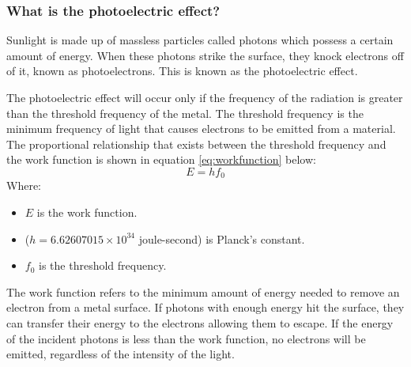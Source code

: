 \subsubsection{What is the photoelectric effect?}
Sunlight is made up of massless particles called photons which possess a certain amount of energy. When these photons strike the surface, they knock electrons off of it, known as photoelectrons. This is known as the photoelectric effect.\vspace{0.5em}

\noindent The photoelectric effect will occur only if the frequency of the radiation is greater than the threshold frequency of the metal. The threshold frequency is the minimum frequency of light that causes electrons to be emitted from a material. The proportional relationship that exists between the threshold frequency and the work function is shown in equation \ref{eq:workfunction} below:
\begin{equation}
    E = hf_0
    \label{eq:workfunction}
\end{equation}
Where:
\begin{itemize}
    \item $E$ is the work function.
    \item ($h = 6.62607015 \times 10^{34}$ joule-second) is Planck's constant.
    \item $f_0$ is the threshold frequency. 
\end{itemize}\vspace{0.5em}
\noindent The work function refers to the minimum amount of energy needed to remove an electron from a metal surface. If photons with enough energy hit the surface, they can transfer their energy to the electrons allowing them to escape. If the energy of the incident photons is less than the work function, no electrons will be emitted, regardless of the intensity of the light.\vspace{0.5em}

